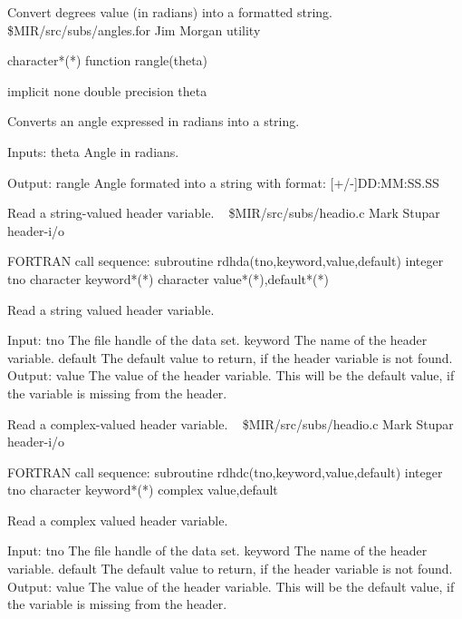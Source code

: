 %
\noindent Convert degrees value (in radians) into a formatted string.
\newline \ 
\newline {} \$MIR/src/subs/angles.for
\newline {} Jim Morgan
\newline {} utility
\par{\tenpoint
{\eightpoint\begintt
      character*(*) function rangle(theta)

      implicit none
      double precision theta

  Converts an angle expressed in radians into a string.

  Inputs:
    theta    Angle in radians.

  Output:
    rangle   Angle formated into a string with format:
               [+/-]DD:MM:SS.SS
\endtt}
\par}
%
\noindent Read a string-valued header variable.
\newline \ 
\newline {} \$MIR/src/subs/headio.c
\newline {} Mark Stupar
\newline \abox{Keywords:} header-i/o
\par{\tenpoint
{\eightpoint\begintt
FORTRAN call sequence:
        subroutine rdhda(tno,keyword,value,default)
        integer tno
        character keyword*(*)
        character value*(*),default*(*)

  Read a string valued header variable.

  Input:
    tno         The file handle of the data set.
    keyword     The name of the header variable.
    default     The default value to return, if the header variable
                is not found.
  Output:
    value       The value of the header variable. This will be the default
                value, if the variable is missing from the header.      
\endtt}
\par}
%
\noindent Read a complex-valued header variable.
\newline \ 
\newline {} \$MIR/src/subs/headio.c
\newline \abox{Responsible:} Mark Stupar
\newline {} header-i/o
\par{\tenpoint
{\eightpoint\begintt
FORTRAN call sequence:
        subroutine rdhdc(tno,keyword,value,default)
        integer tno
        character keyword*(*)
        complex value,default

  Read a complex valued header variable.

  Input:
    tno         The file handle of the data set.
    keyword     The name of the header variable.
    default     The default value to return, if the header variable
                is not found.
  Output:
    value       The value of the header variable. This will be the default
                value, if the variable is missing from the header.      
\endtt}
\par}
